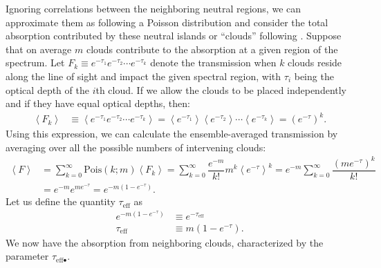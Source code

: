 Ignoring correlations between the neighboring neutral regions, we can approximate them as following a Poisson distribution and consider the total absorption contributed by these neutral islands or ``clouds'' following
\cite{Zuo}. Suppose that on average $m$ clouds contribute to the absorption at a given region of the spectrum.
Let $F_k \equiv e^{-\tau_1}e^{-\tau_2}\cdots e^{-\tau_k}$ denote the transmission when $k$ clouds reside along the line of sight and impact the given spectral region, with $\tau_i$ being the optical depth of the $i$th cloud. If we allow the clouds to be placed independently and if they have equal optical depths, then:
\begin{align}
\left\langle F_{k} \right\rangle &\equiv \left\langle e^{-\tau_1}e^{-\tau_2}\cdots e^{-\tau_k} \right\rangle = \left\langle e^{-\tau_1} \right\rangle \left\langle e^{-\tau_2} \right\rangle \cdots \left\langle e^{-\tau_k} \right\rangle = \left( e^{-\tau} \right)^{k}.
\end{align}
Using this expression, we can calculate the ensemble-averaged transmission by averaging over all the possible numbers of intervening clouds:
\begin{align}
\left\langle F \right\rangle &= \sum_{k = 0}^{\infty} \text{Pois}(k;m) \left\langle F_k \right\rangle = \sum_{k = 0}^{\infty} \dfrac{e^{-m}}{k!}m^{k}\left\langle e^{-\tau}\right\rangle^{k} = e^{-m}\sum_{k = 0}^{\infty} \dfrac{\left(me^{-\tau}\right)^{k}}{k!} \\
&= e^{-m}e^{me^{-\tau}} = e^{-m\left(1-e^{-\tau}\right)}.
\end{align}
Let us define the quantity $\tau_{\text{eff}}$ as
\begin{align}
e^{-m\left(1-e^{-\tau}\right)} &\equiv e^{-\tau_{\text{eff}}} \\
\tau_{\text{eff}} &\equiv m\left(1-e^{-\tau}\right).
\end{align}
We now have the absorption from neighboring clouds, characterized by the parameter $\tau_{\text{eff}•}$. 

